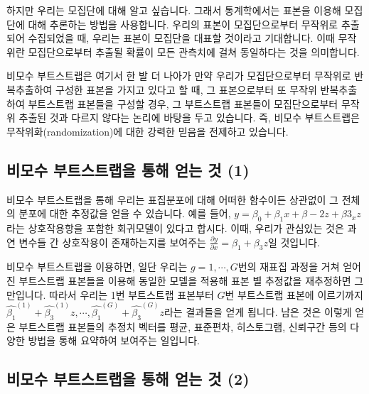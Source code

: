 \documentclass[
]{book}
\begin{document}
하지만 우리는 모집단에 대해 알고 싶습니다. 그래서 통계학에서는 표본을 이용해 모집단에 대해 추론하는 방법을 사용합니다. 우리의 표본이 모집단으로부터 무작위로 추출되어 수집되었을 때, 우리는 표본이 모집단을 대표할 것이라고 기대합니다. 이때 무작위란 모집단으로부터 추출될 확률이 모든 관측치에 걸쳐 동일하다는 것을 의미합니다.

비모수 부트스트랩은 여기서 한 발 더 나아가 만약 우리가 모집단으로부터 무작위로 반복추출하여 구성한 표본을 가지고 있다고 할 때, 그 표본으로부터 또 무작위 반복추출하여 부트스트랩 표본들을 구성할 경우, 그 부트스트랩 표본들이 모집단으로부터 무작위 추출된 것과 다르지 않다는 논리에 바탕을 두고 있습니다. 즉, 비모수 부트스트랩은 무작위화(randomization)에 대한 강력한 믿음을 전제하고 있습니다.

\hypertarget{uxbe44uxbaa8uxc218-uxbd80uxd2b8uxc2a4uxd2b8uxb7a9uxc744-uxd1b5uxd574-uxc5bbuxb294-uxac83-1}{%
\subsection{비모수 부트스트랩을 통해 얻는 것 (1)}\label{uxbe44uxbaa8uxc218-uxbd80uxd2b8uxc2a4uxd2b8uxb7a9uxc744-uxd1b5uxd574-uxc5bbuxb294-uxac83-1}}

비모수 부트스트랩을 통해 우리는 표집분포에 대해 어떠한 함수이든 상관없이 그 전체의 분포에 대한 추정값을 얻을 수 있습니다. 예를 들어, \(y = \beta_0 + \beta_1x + \beta-2z + \beta3_xz\)라는 상호작용항을 포함한 회귀모델이 있다고 합시다. 이때, 우리가 관심있는 것은 과연 변수들 간 상호작용이 존재하는지를 보여주는 \(\frac{\partial y}{\partial x} = \beta_1 + \beta_3z\)일 것입니다.

비모수 부트스트랩을 이용하면, 일단 우리는 \(g = 1, \cdots, G\)번의 재표집 과정을 거쳐 얻어진 부트스트랩 표본들을 이용해 동일한 모델을 적용해 표본 별 추정값을 재추정하면 그만입니다. 따라서 우리는 1번 부트스트랩 표본부터 \(G\)번 부트스트랩 표본에 이르기까지 \(\hat{\beta_1}^{(1)} + \hat{\beta_3}^{(1)}z, \cdots, \hat{\beta_1}^{(G)} + \hat{\beta_3}^{(G)}z\)라는 결과들을 얻게 됩니다. 남은 것은 이렇게 얻은 부트스트랩 표본들의 추정치 벡터를 평균, 표준편차, 히스토그램, 신뢰구간 등의 다양한 방법을 통해 요약하여 보여주는 일입니다.

\hypertarget{uxbe44uxbaa8uxc218-uxbd80uxd2b8uxc2a4uxd2b8uxb7a9uxc744-uxd1b5uxd574-uxc5bbuxb294-uxac83-2}{%
\subsection{비모수 부트스트랩을 통해 얻는 것 (2)}\label{uxbe44uxbaa8uxc218-uxbd80uxd2b8uxc2a4uxd2b8uxb7a9uxc744-uxd1b5uxd574-uxc5bbuxb294-uxac83-2}}
\end{document}
